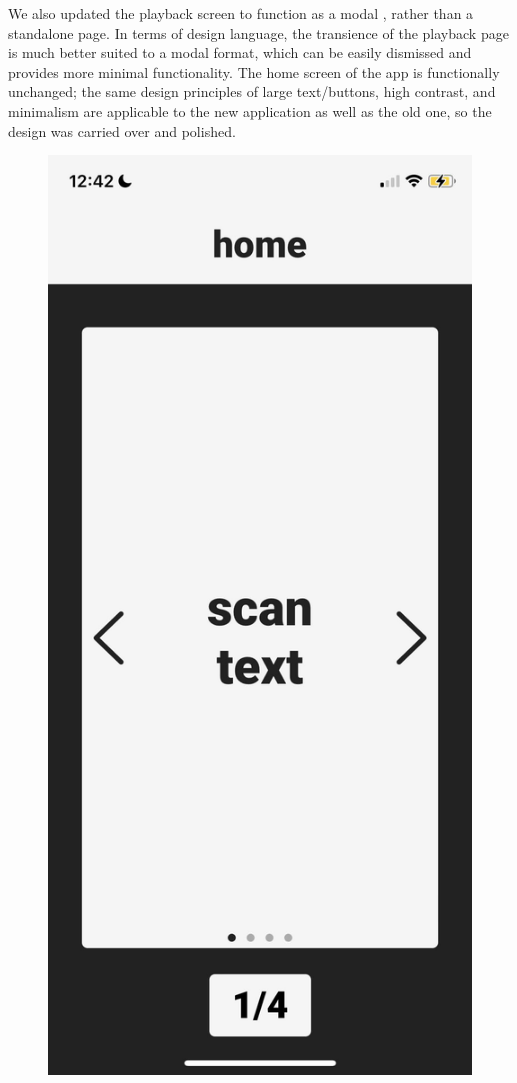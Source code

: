 \documentclass[a4paper,11pt]{article}
\begin{document}
We also updated the playback screen to function as a modal \cite{apple-modals}, rather than a standalone page. In terms of design language, the transience of the playback page is much better suited to a modal format, which can be easily dismissed and provides more minimal functionality. The home screen of the app is functionally unchanged; the same design principles of large text/buttons, high contrast, and minimalism are applicable to the new application as well as the old one, so the design was carried over and polished.

\begin{figure}[H]
\centering
\includegraphics[scale=0.2]{img/app/landing1.png}

\end{figure}
\end{document}

